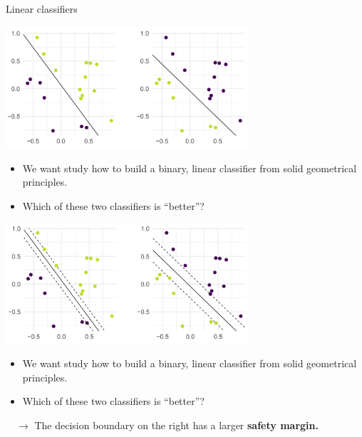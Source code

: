 \begin{vbframe}{Linear classifiers}


\begin{center}
\includegraphics[width =9cm]{figure_man/linear-classifiers01.png} \\
\end{center}


\vspace{-0.5em}

\begin{itemize}
    \item We want study how to build a binary, linear classifier 
      from solid geometrical principles.  
    \item Which of these two classifiers is \enquote{better}?
\end{itemize}
  
  \framebreak
  

\begin{center}
\includegraphics[width =9cm]{figure_man/linear-classifiers02.png} \\
\end{center}


\vspace{-0.5em}

\begin{itemize}
    \item We want study how to build a binary, linear classifier 
      from solid geometrical principles.  
    \item Which of these two classifiers is \enquote{better}?
\end{itemize}
  
    $\quad \rightarrow$ The decision boundary on the right has a larger \textbf{safety margin.}


\end{vbframe}


